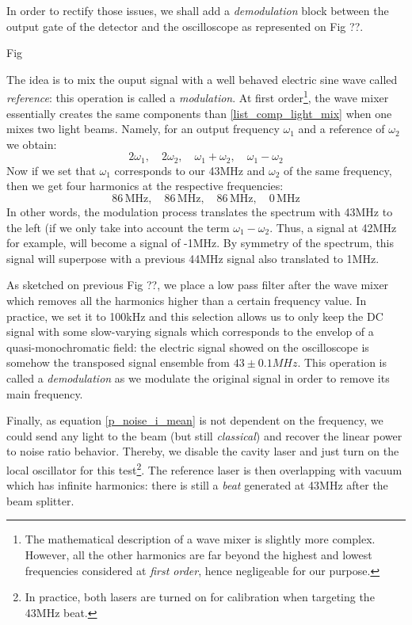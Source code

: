 \documentclass[12pt]{report}
\begin{document}
In order to rectify those issues, we shall add a \textit{demodulation} block between the output gate of the detector and the oscilloscope as represented on Fig ??.

Fig

The idea is to mix the ouput signal with a well behaved electric sine wave called \textit{reference}: this operation is called a \textit{modulation}. At first order\footnote{The mathematical description of a wave mixer is slightly more complex. However, all the other harmonics are far beyond the highest and lowest frequencies considered at \textit{first order}, hence negligeable for our purpose.}, the wave mixer essentially creates the same components than \eqref{list_comp_light_mix} when one mixes two light beams. Namely, for an output frequency $\omega_1$ and a reference of $\omega_2$ we obtain:
\begin{equation}
2\omega_1, \quad 2\omega_2, \quad \omega_1 + \omega_2, \quad \omega_1 - \omega_2
\end{equation}
Now if we set that $\omega_1$ corresponds to our 43MHz and $\omega_2$ of the same frequency, then we get four harmonics at the respective frequencies:
\begin{equation}
86\,\textrm{MHz}, \quad 86\,\textrm{MHz}, \quad 86\,\textrm{MHz}, \quad 0\,\textrm{MHz}
\end{equation}
In other words, the modulation process translates the spectrum with 43MHz to the left (if we only take into account the term $\omega_1 -\omega_2$. Thus, a signal at 42MHz for example, will become a signal of -1MHz. By symmetry of the spectrum, this signal will superpose with a previous 44MHz signal also translated to 1MHz. 

As sketched on previous Fig ??, we place a low pass filter after the wave mixer which removes all the harmonics higher than a certain frequency value. In practice, we set it to 100kHz and this selection allows us to only keep the DC signal with some slow-varying signals which corresponds to the envelop of a quasi-monochromatic field: the electric signal showed on the oscilloscope is somehow the transposed signal ensemble from $43\pm 0.1MHz$. This operation is called a \textit{demodulation} as we modulate the original signal in order to remove its main frequency.

Finally, as equation \eqref{p_noise_i_mean} is not dependent on the frequency, we could send any light to the beam (but still \textit{classical}) and recover the linear power to noise ratio behavior. Thereby, we disable the cavity laser and just turn on the local oscillator for this test\footnote{In practice, both lasers are turned on for calibration when targeting the 43MHz beat.}. The reference laser is then overlapping with vacuum which has infinite harmonics: there is still a \textit{beat} generated at 43MHz after the beam splitter.
\end{document}

